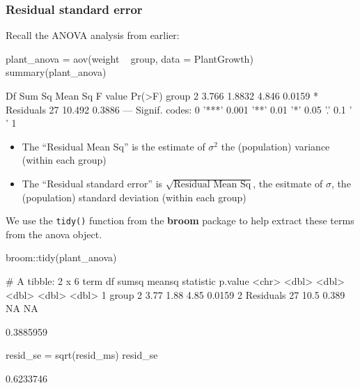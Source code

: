 \documentclass[a4paper]{article}
\begin{document}
\subsubsection{Residual standard error}
Recall the ANOVA analysis from earlier:
\begin{Schunk}
\begin{Sinput}
plant_anova = aov(weight ~ group, data = PlantGrowth)
summary(plant_anova)
\end{Sinput}
\begin{Soutput}
            Df Sum Sq Mean Sq F value Pr(>F)  
group        2  3.766  1.8832   4.846 0.0159 *
Residuals   27 10.492  0.3886                 
---
Signif. codes:  0 '***' 0.001 '**' 0.01 '*' 0.05 '.' 0.1 ' ' 1
\end{Soutput}
\end{Schunk}
\begin{itemize}
	\item The ``Residual Mean Sq'' is the estimate of \( \sigma^2 \)  the (population) variance (within each group)
	\item The ``Residual standard error'' is \( \sqrt{\text{Residual Mean Sq}} \), the esitmate of \( \sigma \), the (population) standard deviation (within each group)
\end{itemize}
We use the \lstinline|tidy()| function from the \textbf{broom} package to help extract these terms from the anova object.
\begin{Schunk}
\begin{Sinput}
broom::tidy(plant_anova)
\end{Sinput}
\begin{Soutput}
# A tibble: 2 x 6
  term         df sumsq meansq statistic p.value
  <chr>     <dbl> <dbl>  <dbl>     <dbl>   <dbl>
1 group         2  3.77  1.88       4.85  0.0159
2 Residuals    27 10.5   0.389     NA    NA     
\end{Soutput}
\begin{Soutput}
[1] 0.3885959
\end{Soutput}
\begin{Sinput}
resid_se = sqrt(resid_ms)
resid_se
\end{Sinput}
\begin{Soutput}
[1] 0.6233746
\end{Soutput}
\end{Schunk}
\end{document}
